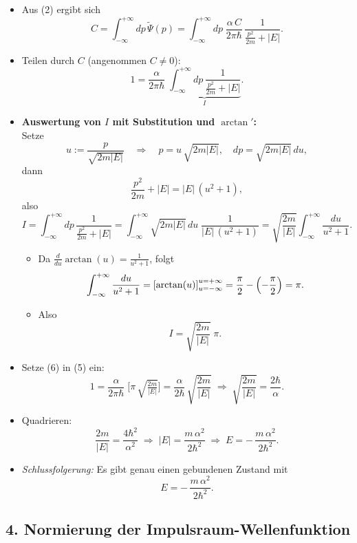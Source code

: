 \documentclass[12pt,a4paper]{scrartcl}
\begin{document}
\begin{itemize}
  \item Aus (2) ergibt sich
  \[
    C = \int_{-\infty}^{+\infty} dp\,\widetilde\Psi(p)
      = \int_{-\infty}^{+\infty} dp\;\frac{\alpha\,C}{2\pi\hbar}\,\frac{1}{\frac{p^2}{2m} + |E|}.
  \]
  \item Teilen durch $C$ (angenommen $C\neq 0$):
  \[
    1 = \frac{\alpha}{2\pi\hbar}\;\underbrace{\int_{-\infty}^{+\infty} dp\,\frac{1}{\frac{p^2}{2m} + |E|}}_{I}.
    \tag{5}
  \]
  \item \textbf{Auswertung von $I$ mit Substitution und $\arctan'$:}\\
    Setze 
    \[
      u := \frac{p}{\sqrt{2m|E|}} \quad\Longrightarrow\quad 
      p = u\,\sqrt{2m|E|},\quad dp = \sqrt{2m|E|}\,du,
    \]
    dann 
    \[
      \frac{p^2}{2m} + |E| = |E|\,(u^2 + 1),
    \]
    also
    \[
      I = \int_{-\infty}^{+\infty} dp\,\frac{1}{\frac{p^2}{2m} + |E|}
        = \int_{-\infty}^{+\infty} \sqrt{2m|E|}\,du\;\frac{1}{|E|\,(u^2 + 1)}
        = \sqrt{\frac{2m}{|E|}} \int_{-\infty}^{+\infty} \frac{du}{u^2 + 1}.
    \]
    \begin{itemize}
      \item Da $\frac{d}{du}\arctan(u) = \frac{1}{u^2 + 1}$, folgt
      \[
        \int_{-\infty}^{+\infty} \frac{du}{u^2 + 1} 
        = \left[\arctan(u)\right]_{u=-\infty}^{u=+\infty} 
        = \frac{\pi}{2} - \Bigl(-\frac{\pi}{2}\Bigr) 
        = \pi.
      \]
      \item Also
      \[
        I = \sqrt{\frac{2m}{|E|}}\;\pi.
        \tag{6}
      \]
    \end{itemize}
  \item Setze (6) in (5) ein:
  \[
    1 = \frac{\alpha}{2\pi\hbar}\;\bigl[\pi\,\sqrt{\tfrac{2m}{|E|}}\bigr]
      = \frac{\alpha}{2\hbar}\,\sqrt{\frac{2m}{|E|}}
      \;\Longrightarrow\;
    \sqrt{\frac{2m}{|E|}} = \frac{2\hbar}{\alpha}.
  \]
  \item Quadrieren:
  \[
    \frac{2m}{|E|} = \frac{4\hbar^2}{\alpha^2}
    \;\Longrightarrow\;
    |E| = \frac{m\,\alpha^2}{2\hbar^2}
    \;\Longrightarrow\;
    E = -\,\frac{m\,\alpha^2}{2\hbar^2}.
    \tag{7}
  \]
  \item \emph{Schlussfolgerung:} Es gibt genau einen gebundenen Zustand mit 
  \[
    E = -\,\frac{m\,\alpha^2}{2\hbar^2}.
  \]
\end{itemize}

\subsection*{4. Normierung der Impulsraum-Wellenfunktion}
\end{document}
